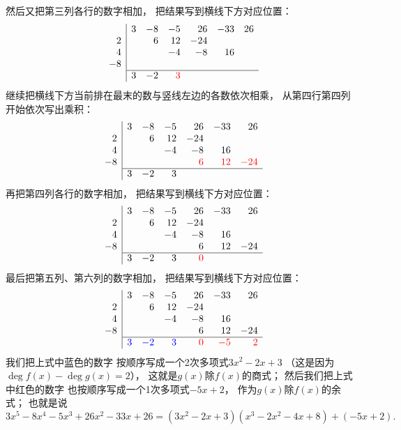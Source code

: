 然后又把第三列各行的数字相加，
把结果写到横线下方对应位置：\begin{equation*}
	\begin{array}{r|*6r}
		& 3 & -8 & -5 & 26 & -33 & 26 \\
		2 && 6 & 12 & -24 \\
		4 &&& -4 & -8 & 16 \\
		-8 \\ \cline{2-7}
		& 3 & -2 & \color{red}3
	\end{array}
\end{equation*}
继续把横线下方当前排在最末的数与竖线左边的各数依次相乘，
从第四行第四列开始依次写出乘积：\begin{equation*}
	\begin{array}{r|*6r}
		& 3 & -8 & -5 & 26 & -33 & 26 \\
		2 && 6 & 12 & -24 \\
		4 &&& -4 & -8 & 16 \\
		-8 &&&& \color{red}6 & \color{red}12 & \color{red}-24 \\ \cline{2-7}
		& 3 & -2 & 3
	\end{array}
\end{equation*}
再把第四列各行的数字相加，
把结果写到横线下方对应位置：\begin{equation*}
	\begin{array}{r|*6r}
		& 3 & -8 & -5 & 26 & -33 & 26 \\
		2 && 6 & 12 & -24 \\
		4 &&& -4 & -8 & 16 \\
		-8 &&&& 6 & 12 & -24 \\ \cline{2-7}
		& 3 & -2 & 3 & \color{red}0
	\end{array}
\end{equation*}
最后把第五列、第六列的数字相加，
把结果写到横线下方对应位置：\begin{equation*}
	\begin{array}{r|*6r}
		& 3 & -8 & -5 & 26 & -33 & 26 \\
		2 && 6 & 12 & -24 \\
		4 &&& -4 & -8 & 16 \\
		-8 &&&& 6 & 12 & -24 \\ \cline{2-7}
		& \color{blue}3 & \color{blue}-2 & \color{blue}3 & \color{red}0 & \color{red}-5 & \color{red}2
	\end{array}
\end{equation*}
我们把上式中蓝色的数字
按顺序写成一个2次多项式\(3x^2-2x+3\)
（这是因为\(\deg f(x)-\deg g(x)=2\)），
这就是\(g(x)\)除\(f(x)\)的商式；
然后我们把上式中红色的数字
也按顺序写成一个1次多项式\(-5x+2\)，
作为\(g(x)\)除\(f(x)\)的余式；
也就是说\begin{equation*}
	3x^5 - 8x^4 - 5x^3 + 26x^2 - 33x + 26
	=(3x^2-2x+3)(x^3 - 2x^2 - 4x + 8)+(-5x+2).
\end{equation*}
